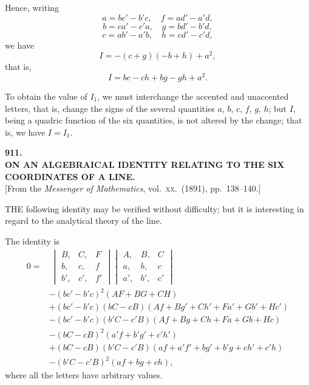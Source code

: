\documentclass[11pt,a4paper]{article}
\begin{document}
Hence, writing
\[
a = b c' - b' c,\quad f = a d' - a' d,
\]
\[
b = c a' - c' a,\quad g = b d' - b' d,
\]
\[
c = a b' - a' b,\quad h = c d' - c' d,
\]
we have
\[
I = -(c + g)(- b + h) + a^2,
\]
that is,
\[
I = bc - ch + bg - gh + a^2.
\]

To obtain the value of $I_1$, we must interchange the accented and unaccented letters, that is, change the signs of the several quantities $a$, $b$, $c$, $f$, $g$, $h$; but $I$, being a quadric function of the six quantities, is not altered by the change; that is, we have $I = I_1$.

\clearpage

\begin{center}
{\large\bfseries 911.}\\[0.5em]
{\large\bfseries ON AN ALGEBRAICAL IDENTITY RELATING TO THE SIX\\ COORDINATES OF A LINE.}\\[0.5em]
\small [From the \emph{Messenger of Mathematics}, vol.\ \textsc{xx}.\ (1891), pp.\ 138--140.]
\end{center}
\medskip

\noindent THE following identity may be verified without difficulty; but it is interesting in regard to the analytical theory of the line.

The identity is
\begin{align*}
0 = &\ \begin{vmatrix} B, & C, & F \\ b, & c, & f \\ b', & c', & f' \end{vmatrix} \begin{vmatrix} A, & B, & C \\ a, & b, & c \\ a', & b', & c' \end{vmatrix}\\
&- (bc' - b'c)^2 (AF + BG + CH)\\
&+ (bc' - b'c)(bC - cB)(Af + Bg' + Ch' + Fa' + Gb' + Hc')\\
&- (bc' - b'c)(b'C - c'B)(Af + Bg + Ch + Fa + Gb + Hc)\\
&- (bC - cB)^2 (a'f + b'g' + c'h')\\
&+ (bC - cB)(b'C - c'B)(af + a'f' + bg' + b'g + ch' + c'h)\\
&- (b'C - c'B)^2 (af + bg + ch),
\end{align*}
where all the letters have arbitrary values.
\end{document}
